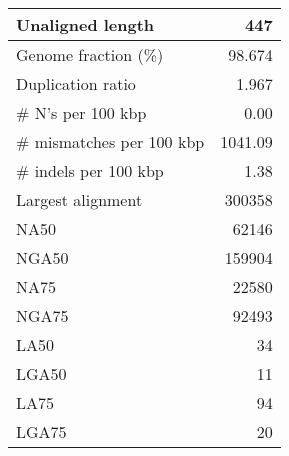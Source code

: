 \documentclass[12pt,a4paper]{article}
\begin{document}
\begin{table}[ht]
\begin{center}
\begin{tabular}{|l*{1}{|r}|}
Unaligned length & 447 \\ \hline
Genome fraction (\%) & 98.674 \\ \hline
Duplication ratio & 1.967 \\ \hline
\# N's per 100 kbp & 0.00 \\ \hline
\# mismatches per 100 kbp & 1041.09 \\ \hline
\# indels per 100 kbp & 1.38 \\ \hline
Largest alignment & 300358 \\ \hline
NA50 & 62146 \\ \hline
NGA50 & 159904 \\ \hline
NA75 & 22580 \\ \hline
NGA75 & 92493 \\ \hline
LA50 & 34 \\ \hline
LGA50 & 11 \\ \hline
LA75 & 94 \\ \hline
LGA75 & 20 \\ \hline
\end{tabular}
\end{center}
\end{table}
\end{document}
